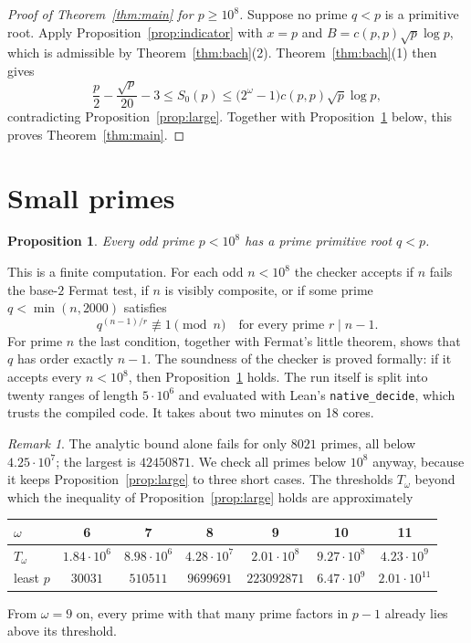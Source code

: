 \documentclass[11pt]{amsart}
\newtheorem{proposition}[theorem]{Proposition}
\theoremstyle{definition}
\theoremstyle{remark}
\newtheorem{remark}[theorem]{Remark}
\newcommand{\lean}[1]{\texttt{#1}}
\begin{document}
\begin{proof}[Proof of Theorem~\ref{thm:main} for $p\ge10^8$]
Suppose no prime $q<p$ is a primitive root. Apply Proposition~\ref{prop:indicator} with $x=p$ and $B=c(p,p)\sqrt p\log p$, which is admissible by Theorem~\ref{thm:bach}(2). Theorem~\ref{thm:bach}(1) then gives
\[
\frac p2-\frac{\sqrt p}{20}-3\le S_0(p)\le\bigl(2^\omega-1\bigr)c(p,p)\sqrt p\log p,
\]
contradicting Proposition~\ref{prop:large}. Together with Proposition~\ref{prop:small} below, this proves Theorem~\ref{thm:main}.
\end{proof}

\section{Small primes}\label{sec:compute}

\begin{proposition}\label{prop:small}
Every odd prime $p<10^8$ has a prime primitive root $q<p$.
\end{proposition}

This is a finite computation. For each odd $n<10^8$ the checker accepts if $n$ fails the base-$2$ Fermat test, if $n$ is visibly composite, or if some prime $q<\min(n,2000)$ satisfies
\[
q^{(n-1)/r}\not\equiv1\pmod n\quad\text{for every prime } r\mid n-1 .
\]
For prime $n$ the last condition, together with Fermat's little theorem, shows that $q$ has order exactly $n-1$. The soundness of the checker is proved formally: if it accepts every $n<10^8$, then Proposition~\ref{prop:small} holds. The run itself is split into twenty ranges of length $5\cdot10^6$ and evaluated with Lean's \lean{native\_decide}, which trusts the compiled code. It takes about two minutes on 18 cores.

\begin{remark}
The analytic bound alone fails for only $8021$ primes, all below $4.25\cdot10^7$; the largest is $42450871$. We check all primes below $10^8$ anyway, because it keeps Proposition~\ref{prop:large} to three short cases. The thresholds $T_\omega$ beyond which the inequality of Proposition~\ref{prop:large} holds are approximately
\begin{center}
\small\setlength{\tabcolsep}{4pt}
\begin{tabular}{@{}lcccccc@{}}
\toprule
$\omega$ & 6 & 7 & 8 & 9 & 10 & 11\\
\midrule
$T_\omega$ & $1.84\cdot10^6$ & $8.98\cdot10^6$ & $4.28\cdot10^7$ & $2.01\cdot10^8$ & $9.27\cdot10^8$ & $4.23\cdot10^9$\\
least $p$ & $30031$ & $510511$ & $9699691$ & $223092871$ & $6.47\cdot10^9$ & $2.01\cdot10^{11}$\\
\bottomrule
\end{tabular}
\end{center}
From $\omega=9$ on, every prime with that many prime factors in $p-1$ already lies above its threshold.
\end{remark}
\end{document}
